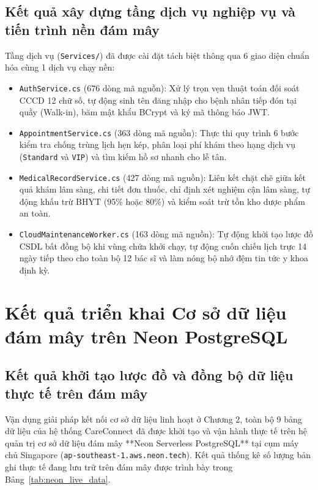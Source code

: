 \subsection{Kết quả xây dựng tầng dịch vụ nghiệp vụ và tiến trình nền đám mây}

Tầng dịch vụ (\texttt{Services/}) đã được cài đặt tách biệt thông qua 6 giao diện chuẩn hóa cùng 1 dịch vụ chạy nền:
\begin{itemize}
    \item \texttt{AuthService.cs} (676 dòng mã nguồn): Xử lý trọn vẹn thuật toán đối soát CCCD 12 chữ số, tự động sinh tên đăng nhập cho bệnh nhân tiếp đón tại quầy (Walk-in), băm mật khẩu BCrypt và ký mã thông báo JWT.
    \item \texttt{AppointmentService.cs} (363 dòng mã nguồn): Thực thi quy trình 6 bước kiểm tra chống trùng lịch hẹn kép, phân loại phí khám theo hạng dịch vụ (\texttt{Standard} và \texttt{VIP}) và tìm kiếm hồ sơ nhanh cho lễ tân.
    \item \texttt{MedicalRecordService.cs} (427 dòng mã nguồn): Liên kết chặt chẽ giữa kết quả khám lâm sàng, chi tiết đơn thuốc, chỉ định xét nghiệm cận lâm sàng, tự động khấu trừ BHYT (95\% hoặc 80\%) và kiểm soát trừ tồn kho dược phẩm an toàn.
    \item \texttt{CloudMaintenanceWorker.cs} (163 dòng mã nguồn): Tự động khởi tạo lược đồ CSDL bất đồng bộ khi vùng chứa khởi chạy, tự động cuốn chiếu lịch trực 14 ngày tiếp theo cho toàn bộ 12 bác sĩ và làm nóng bộ nhớ đệm tin tức y khoa định kỳ.
\end{itemize}

\section{Kết quả triển khai Cơ sở dữ liệu đám mây trên Neon PostgreSQL}

\subsection{Kết quả khởi tạo lược đồ và đồng bộ dữ liệu thực tế trên đám mây}

Vận dụng giải pháp kết nối cơ sở dữ liệu linh hoạt ở Chương 2, toàn bộ 9 bảng dữ liệu của hệ thống CareConnect đã được khởi tạo và vận hành thực tế trên hệ quản trị cơ sở dữ liệu đám mây **Neon Serverless PostgreSQL** tại cụm máy chủ Singapore (\texttt{ap-southeast-1.aws.neon.tech}). Kết quả thống kê số lượng bản ghi thực tế đang lưu trữ trên đám mây được trình bày trong Bảng~\ref{tab:neon_live_data}.


